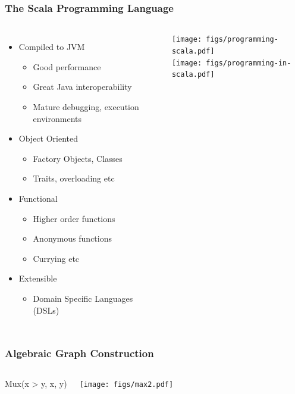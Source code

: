 \documentclass[xcolor=pdflatex,dvipsnames,table]{beamer}
\begin{document}
\begin{frame}[fragile]
\frametitle{The Scala Programming Language}

\begin{columns}[c]


\begin{itemize}
\item Compiled to JVM
\begin{itemize}
\item Good performance
\item Great Java interoperability
\item Mature debugging, execution environments
\end{itemize}
\item Object Oriented
\begin{itemize}
\item Factory Objects, Classes
\item Traits, overloading etc
\end{itemize}
\item Functional
\begin{itemize}
\item Higher order functions
\item Anonymous functions
\item Currying etc
\end{itemize}
\item Extensible
\begin{itemize}
\item Domain Specific Languages (DSLs)
\end{itemize}
\end{itemize}


\begin{center}
\texttt{[image: figs/programming-scala.pdf]} \\
\texttt{[image: figs/programming-in-scala.pdf]}
\end{center}

\end{columns}
\end{frame}

\begin{frame}[fragile]
\frametitle{Algebraic Graph Construction}

\begin{columns}
{
\begin{scala}
Mux(x > y, x, y)
\end{scala}
}


\begin{center}
\texttt{[image: figs/max2.pdf]} 
\end{center}
\end{columns}
\end{frame}
\end{document}
